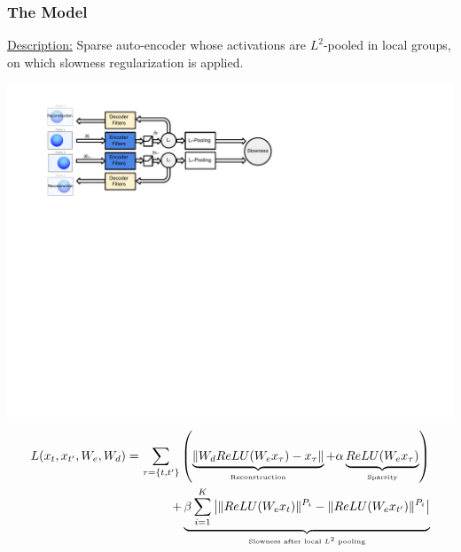 \documentclass{beamer}
\begin{document}
\begin{frame}
\frametitle{The Model}
\underline{Description:} Sparse auto-encoder whose activations are $L^2$-pooled in local groups, on which slowness regularization is applied.
\begin{center} 
\includegraphics[scale=0.50,trim = 15 350 290 39, clip]{./Figures/Project1/diagram.pdf} \\
{\small
\begin{eqnarray}
\nonumber 
L(x_t,x_{t'},W_e,W_d)= \sum_{\tau = \{t,t'\}} \left(\underbrace{\|W_d ReLU(W_e x_\tau) - x_\tau\|}_{\mbox{\tiny Reconstruction}} +  \alpha \underbrace{ReLU(W_e x_\tau)}_{\mbox{\tiny Sparsity}} \right) \\
\nonumber
 + \underbrace{\beta \sum_{i=1}^K \left| \|ReLU(W_ex_t)\|^{P_i} - \|ReLU(W_ex_{t'})\|^{P_i} \right|}_{\mbox{\tiny Slowness after local $L^2$ pooling}}
\end{eqnarray}}
\end{center} 
\end{frame} 
\end{document}
